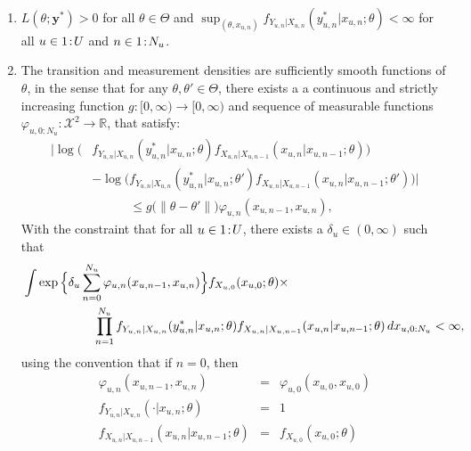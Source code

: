   \begin{enumerate}
    \item $L(\theta; \mathbf{y}^*) > 0$ for all $\theta \in \Theta$ and $\sup_{(\theta, x_{u, n})}f_{Y_{u, n}|X_{u, n}}(y^*_{u, n}|x_{u,n}; \theta) < \infty$ for all $u \in {1}\!:\!{U}$ and $n \in {1}\!:\!{N_u}$. \label{assumption:1}
    \item The transition and measurement densities are sufficiently smooth functions of $\theta$, in the sense that for any $\theta, \theta' \in \Theta$, there exists a a continuous and strictly increasing function $g: [0, \infty) \rightarrow [0, \infty)$ and sequence of measurable functions $\varphi_{u, 0:N_u}: \mathcal{X}^2 \rightarrow \mathbb{R}$, that satisfy:
    \begin{align*}
    \big\vert\log\big( & f_{Y_{u, n}|X_{u, n}}(y^*_{u, n}|x_{u, n};\theta)f_{X_{u, n}|X_{u, n-1}}(x_{u, n}|x_{u, n-1};\theta)\big) \\
    & - \log\big(f_{Y_{u, n}|X_{u, n}}(y^*_{u, n}|x_{u, n};\theta')f_{X_{u, n}|X_{u, n-1}}(x_{u, n}|x_{u, n-1};\theta')\big)\big\vert \\
    & \qquad\quad \leq g\big(\|\theta - \theta'\|\big)\varphi_{u, n}(x_{u, n-1}, x_{u, n}),
    \end{align*}
    With the constraint that for all $u\in {1}\!:\!{U}$, there exists a $\delta_u \in (0, \infty)$ such that
    \begin{align*}
    &  \int \exp\Big\{\delta_u \sum_{n = 0}^{N_u}\varphi_{u, n}(x_{u, n-1}, x_{u, n})\Big\} f_{X_{u, 0}}(x_{u, 0};\theta) \times
    \\
    & \hspace{20mm} \prod_{n = 1}^{N_u}f_{Y_{u, n}|X_{u, n}}(y^*_{u, n}|x_{u, n};\theta)f_{X_{u, n}|X_{u, n-1}}(x_{u, n}|x_{u, n-1};\theta)\, dx_{u, 0:N_u} < \infty,
    \end{align*}
    using the convention that if $n=0$, then
    \begin{eqnarray*}
      \varphi_{u, n}(x_{u, n-1}, x_{u, n}) &=& \varphi_{u, 0}(x_{u, 0}, x_{u, 0})
      \\
      f_{Y_{u, n}|X_{u, n}}(\cdot | x_{u, n}; \theta) &=& 1
      \\
      f_{X_{u, n} | X_{u, n-1}}(x_{u, n}|x_{u, n-1};\theta) &=& f_{X_{u, 0}}(x_{u, 0}; \theta)
    \end{eqnarray*}
    \label{assumption:2}
    

\end{enumerate}
